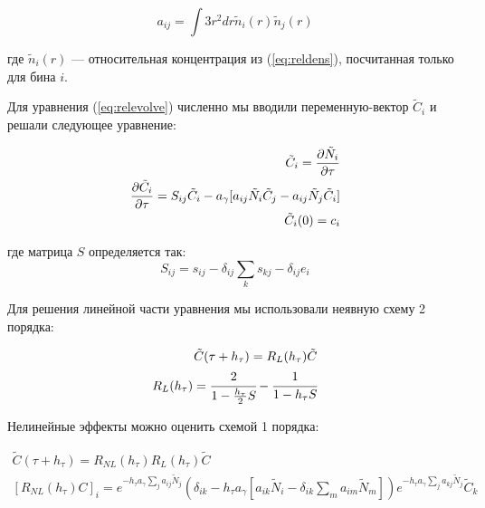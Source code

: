 \begin{equation}
	a_{ij} = \int{3r^2dr \tilde{n}_i(r)\tilde{n}_j(r)}
\end{equation}

где $\tilde{n}_i(r)$ --- относительная концентрация из (\ref{eq:reldens}), посчитанная только для бина $i$.


Для уравнения (\ref{eq:relevolve}) численно мы вводили переменную-вектор $\tilde{C}_{i}$ и решали следующее уравнение:

\begin{equation}
\begin{split}
	\tilde{C}_i = \frac{\partial \tilde{N}_i}{\partial \tau} \\
	\frac{\partial \tilde{C}_i}{\partial \tau} = S_{ij} \tilde{C}_{i} - a_{\gamma} [a_{ij} \tilde{N}_i \tilde{C}_{j} - a_{ij} \tilde{N}_j \tilde{C}_{i}] \\
	\tilde{C}_i(0) = c_i
\end{split}
\end{equation}

где матрица $S$ определяется так:
\begin{equation}
	S_{ij} = s_{ij} - \delta_{ij} \sum_{k}{s_{kj}} - \delta_{ij} e_{i}
\end{equation}

Для решения линейной части уравнения мы использовали неявную схему 2 порядка:

\begin{equation}
\begin{split}
	\tilde{C}(\tau + h_{\tau}) = R_L(h_{\tau}) \tilde{C} \\
	R_L(h_{\tau}) = \cfrac{2}{1 - \frac{h_{\tau}}{2}S} - \cfrac{1}{1 - h_{\tau}S}
\end{split}
\end{equation}

Нелинейные эффекты можно оценить схемой 1 порядка:

\begin{equation}
	\begin{split}
		\tilde{C}(\tau + h_{\tau}) = R_{NL}(h_{\tau}) R_L(h_{\tau}) \tilde{C} \\
		[R_{NL}(h_{\tau}) C]_i = e^{-h_{\tau} a_{\gamma} \sum_j{a_{ij}\tilde{N}_j} } (\delta_{ik} - h_{\tau} a_{\gamma} [a_{ik}\tilde{N}_i - \delta_{ik}\sum_{m}{a_{im}\tilde{N}_m}])
		e^{-h_{\tau} a_{\gamma} \sum_j{a_{kj}\tilde{N}_j} } \tilde{C}_k
	\end{split}
\end{equation}




